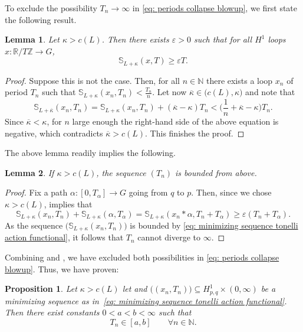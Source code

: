 \documentclass[11pt,reqno]{amsart}
\theoremstyle{plain}
\newtheorem{lem}[thm]{Lemma}
\newtheorem{prop}[thm]{Proposition}
\theoremstyle{definition}
\theoremstyle{plain} %
\newtheorem{lem}[lem]{Lemma}
\newtheorem{prop}[prop]{Proposition}
\theoremstyle{definition} %
\numberwithin{equation}{section}
\def\NN{{\mathbb N}}
\def\SS{{\mathbb{S}}}
\def\bar{\overline}
\begin{document}
To exclude the possibility \( T_n \to \infty \) in \eqref{eq: periods collapse blowup}, we first state the following result.
\begin{lem}\label{lem: loops action bounded by period from below}
    Let $\kappa > c(L)$. Then there exists $\varepsilon > 0$ such that for all \( H^1 \) loops $x \colon \mathbb{R} / T \mathbb{Z} \to G$,
    \[
       \SS_{L+\kappa}(x,T) \geq \varepsilon T.
    \]
\end{lem}
\begin{proof}
    Suppose this is not the case. Then, for all \( n \in \mathbb{N} \) there exists a loop \( x_n \) of period \( T_n \) such that \( \mathbb S_{L+ \kappa}(x_n, T_n) < \frac{T_n}{n}\). 
    Let now \( \bar \kappa \in \big( c(L), \kappa \big) \) and note that
    \begin{equation*}
        \mathbb S_{L + \bar \kappa} (x_n, T_n) = \SS_{L + \kappa} (x_n, T_n) + (\bar \kappa - \kappa) T_n < \bigg( \frac{1}{n} + \bar \kappa - \kappa \bigg) T_n.
    \end{equation*}
    Since \( \bar \kappa < \kappa \), for \( n \) large enough the right-hand side of the above equation is negative, which contradicts \( \bar \kappa > c(L) \). This finishes the proof.
\end{proof}
The above lemma readily implies the following.
\begin{lem}\label{lem: period bounded from above}
     If \( \kappa > c(L) \), the sequence \( (T_n) \) is bounded from above.
\end{lem}
\begin{proof}
    Fix a path \( \alpha \colon [0, T_\alpha] \to G \) going from \( q \) to \( p \). Then, since we chose \( \kappa > c(L) \),  implies that
    \begin{equation*}
        \SS_{L + \kappa} (x_n, T_n) + \SS_{L + \kappa}(\alpha, T_\alpha) = \SS_{L + \kappa}(x_n * \alpha, T_n + T_\alpha) \geq \varepsilon (T_n + T_\alpha).
    \end{equation*}
    As the sequence \( \big( \SS_{L + \kappa}(x_n, T_n) \big) \) is bounded by \eqref{eq: minimizing sequence tonelli action functional}, it follows that \( T_n \) cannot diverge to \( \infty \).
\end{proof}
Combining  and , we have excluded both possibilities in \eqref{eq: periods collapse blowup}. Thus, we have proven:
\begin{prop}\label{Iprop: mini seques bounded from below and above}
    Let \( \kappa > c(L) \) let and $ \big( (x_n,T_n) \big) \subseteq H^1_{p,q}\times (0,\infty)$ be a minimizing sequence as in~\eqref{eq: minimizing sequence tonelli action functional}. 
    Then there exist constants $0<a<b<\infty$ such that
    \[
        T_n \in [a,b] \qquad \forall n \in \NN.
    \]
\end{prop}
\end{document}
